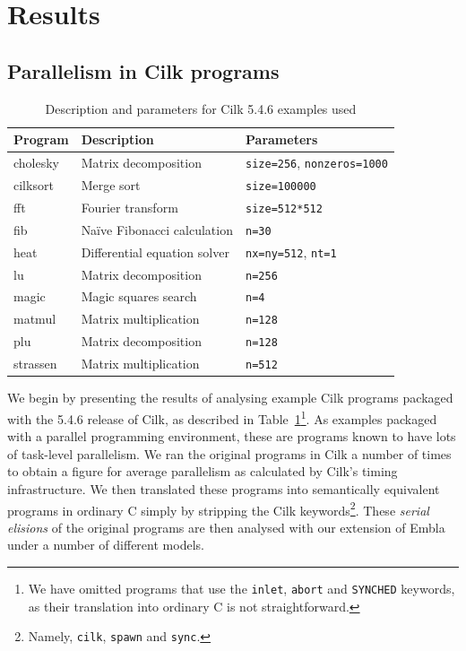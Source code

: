 \section{Results} \label{sresults}

\subsection{Parallelism in Cilk programs} \label{sresults:cilk}

\begin{table}
\small
\begin{tabular}{ | l | l | l | }
\hline
Program & Description & Parameters \\
\hline
\textsf{cholesky} & Matrix decomposition & \texttt{size=256}, \texttt{nonzeros=1000} \\
\textsf{cilksort} & Merge sort & \texttt{size=100000} \\
\textsf{fft} & Fourier transform & \texttt{size=512*512} \\
\textsf{fib} & Na\"ive Fibonacci calculation & \texttt{n=30} \\
\textsf{heat} & Differential equation solver & \texttt{nx=ny=512}, \texttt{nt=1} \\ 
\textsf{lu} & Matrix decomposition & \texttt{n=256} \\
\textsf{magic} & Magic squares search & \texttt{n=4} \\
\textsf{matmul} & Matrix multiplication & \texttt{n=128} \\
\textsf{plu} & Matrix decomposition & \texttt{n=128} \\
\textsf{strassen} & Matrix multiplication & \texttt{n=512} \\
\hline
\end{tabular}
\caption{Description and parameters for Cilk 5.4.6 examples used}
\label{cilk-ex}
\end{table}

We begin by presenting the results of analysing example Cilk programs packaged with the 5.4.6 release of Cilk, as described in Table~\ref{cilk-ex}\footnote{We have omitted programs that use the \texttt{inlet}, \texttt{abort} and \texttt{SYNCHED} keywords, as their translation into ordinary C is not straightforward.}.
As examples packaged with a parallel programming environment, these are programs known to have lots of task-level parallelism.
We ran the original programs in Cilk a number of times to obtain a figure for average parallelism as calculated by Cilk's timing infrastructure.
We then translated these programs into semantically equivalent programs in ordinary C simply by stripping the Cilk keywords\footnote{Namely, \texttt{cilk}, \texttt{spawn} and \texttt{sync}.}.
These \emph{serial elisions} of the original programs are then analysed with our extension of Embla under a number of different models.

